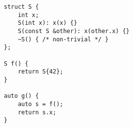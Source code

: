 \begin{lstlisting}[title=\href{https://godbolt.org/z/EE6eOC}{\texttt{godbolt.org/z/EE6eOC}}]
struct S {
    int x;
    S(int x): x(x) {}
    S(const S &other): x(other.x) {}
    ~S() { /* non-trivial */ }
};

S f() {
    return S{42};
}

auto g() {
    auto s = f();
    return s.x;
}
\end{lstlisting}
